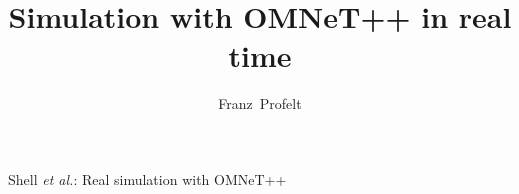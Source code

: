 \documentclass[journal]{IEEEtran}
\begin{document}
%
\title{Simulation with OMNeT++ in real time}
%
%
%

\author{Franz~Profelt}%

% 
%



%
{Shell \MakeLowercase{\textit{et al.}}: Real simulation with OMNeT++}
% 
\end{document}
